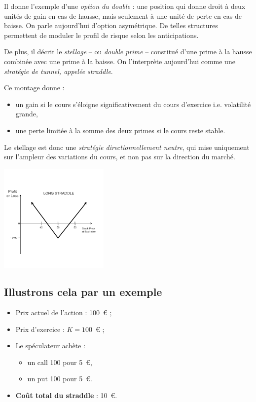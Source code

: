 \documentclass[12pt,a4paper]{article}
\begin{document}
Il donne l’exemple d’une \textit{option du double} : une position qui donne droit à deux unités de gain en cas de hausse, mais seulement à une unité de perte en cas de baisse. On parle aujourd’hui d’option asymétrique. De telles structures permettent de moduler le profil de risque selon les anticipations.

De plus, il décrit le \textit{stellage} -- ou \textit{double prime} -- constitué d’une prime à la hausse combinée avec une prime à la baisse. On l’interprète aujourd’hui comme une \textit{stratégie de tunnel, appelée straddle}.

Ce montage donne :
\begin{itemize}
  \item un gain si le cours s’éloigne significativement du cours d’exercice i.e. volatilité grande,
  \item une perte limitée à la somme des deux primes si le cours reste stable.
\end{itemize}

Le stellage est donc une \textit{stratégie directionnellement neutre}, qui mise uniquement sur l’ampleur des variations du cours, et non pas sur la direction du marché.

\begin{center}
    \includegraphics[width=0.4\textwidth]{strad.png}
\end{center}

\medskip

\subsection{Illustrons cela par un exemple}

\begin{itemize}
    \item Prix actuel de l’action : 100~€ ;
    \item Prix d’exercice : $K = 100$~€ ;
    \item Le spéculateur achète :
    \begin{itemize}
        \item un call 100 pour 5~€,
        \item un put 100 pour 5~€.
    \end{itemize}
    \item \textbf{Coût total du straddle} : 10~€.
\end{itemize}
\end{document}
